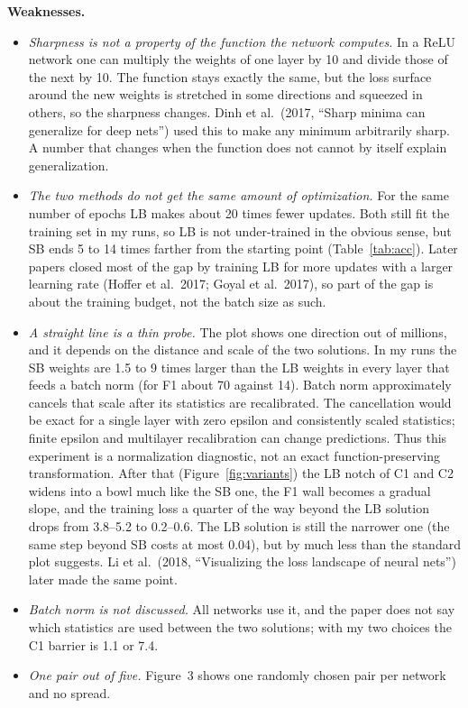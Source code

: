 \textbf{Weaknesses.}
\begin{itemize}
  \item \emph{Sharpness is not a property of the function the network computes.} In a ReLU network one can multiply the weights of one layer by 10 and divide those of the next by 10. The function stays exactly the same, but the loss surface around the new weights is stretched in some directions and squeezed in others, so the sharpness changes. Dinh et al.\ (2017, ``Sharp minima can generalize for deep nets'') used this to make any minimum arbitrarily sharp. A number that changes when the function does not cannot by itself explain generalization.
  \item \emph{The two methods do not get the same amount of optimization.} For the same number of epochs LB makes about 20 times fewer updates. Both still fit the training set in my runs, so LB is not under-trained in the obvious sense, but SB ends 5 to 14 times farther from the starting point (Table~\ref{tab:acc}). Later papers closed most of the gap by training LB for more updates with a larger learning rate (Hoffer et al.\ 2017; Goyal et al.\ 2017), so part of the gap is about the training budget, not the batch size as such.
  \item \emph{A straight line is a thin probe.} The plot shows one direction out of millions, and it depends on the distance and scale of the two solutions. In my runs the SB weights are 1.5 to 9 times larger than the LB weights in every layer that feeds a batch norm (for F1 about 70 against 14). Batch norm approximately cancels that scale after its statistics are recalibrated. The cancellation would be exact for a single layer with zero epsilon and consistently scaled statistics; finite epsilon and multilayer recalibration can change predictions. Thus this experiment is a normalization diagnostic, not an exact function-preserving transformation. After that (Figure~\ref{fig:variants}) the LB notch of C1 and C2 widens into a bowl much like the SB one, the F1 wall becomes a gradual slope, and the training loss a quarter of the way beyond the LB solution drops from 3.8--5.2 to 0.2--0.6. The LB solution is still the narrower one (the same step beyond SB costs at most 0.04), but by much less than the standard plot suggests. Li et al.\ (2018, ``Visualizing the loss landscape of neural nets'') later made the same point.
  \item \emph{Batch norm is not discussed.} All networks use it, and the paper does not say which statistics are used between the two solutions; with my two choices the C1 barrier is 1.1 or 7.4.
  \item \emph{One pair out of five.} Figure~3 shows one randomly chosen pair per network and no spread.
\end{itemize}

